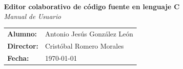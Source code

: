 \begin{titlepage}
\begin{center}
		\textbf{\Large Editor colaborativo de código fuente en lenguaje C}
		\\
		\vspace{1cm}
		\emph{\Large Manual de Usuario}
		\vspace{5cm}
		
	\end{center}

	\begin{flushright}
		\begin{tabular}{ll}
			\large{\textbf{Alumno:}}	&
			\large{Antonio Jesús González León} \\

			\large{\textbf{Director:}}	&
			\large{Cristóbal Romero Morales} \\

			\large{\textbf{Fecha:}}	&
			\large{\today} \\
		\end{tabular}
	\end{flushright}

\end{titlepage}

\newpage{\pagestyle{empty}\cleardoublepage}